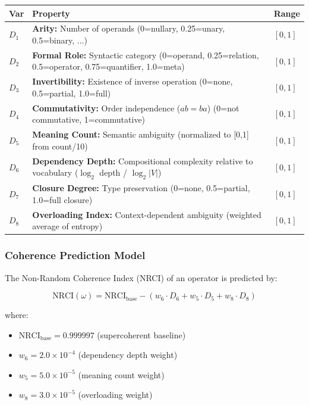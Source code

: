 \begin{table}[h]
\centering
\small
\begin{tabular}{lp{7cm}l}
\toprule
\textbf{Var} & \textbf{Property} & \textbf{Range} \\
\midrule
$D_1$ & \textbf{Arity:} Number of operands (0=nullary, 0.25=unary, 0.5=binary, ...) & $[0, 1]$ \\
$D_2$ & \textbf{Formal Role:} Syntactic category (0=operand, 0.25=relation, 0.5=operator, 0.75=quantifier, 1.0=meta) & $[0, 1]$ \\
$D_3$ & \textbf{Invertibility:} Existence of inverse operation (0=none, 0.5=partial, 1.0=full) & $[0, 1]$ \\
$D_4$ & \textbf{Commutativity:} Order independence ($ab = ba$) (0=not commutative, 1=commutative) & $[0, 1]$ \\
$D_5$ & \textbf{Meaning Count:} Semantic ambiguity (normalized to [0,1] from count/10) & $[0, 1]$ \\
$D_6$ & \textbf{Dependency Depth:} Compositional complexity relative to vocabulary ($\log_2$ depth / $\log_2|V|$) & $[0, 1]$ \\
$D_7$ & \textbf{Closure Degree:} Type preservation (0=none, 0.5=partial, 1.0=full closure) & $[0, 1]$ \\
$D_8$ & \textbf{Overloading Index:} Context-dependent ambiguity (weighted average of entropy) & $[0, 1]$ \\
\bottomrule
\end{tabular}
\end{table}

\subsubsection{Coherence Prediction Model}

The Non-Random Coherence Index (NRCI) of an operator is predicted by:

\begin{equation}
\boxed{\text{NRCI}(\omega) = \text{NRCI}_{\text{base}} - \left(w_6 \cdot D_6 + w_5 \cdot D_5 + w_8 \cdot D_8\right)}
\end{equation}

where:
\begin{itemize}
    \item $\text{NRCI}_{\text{base}} = 0.999997$ (supercoherent baseline)
    \item $w_6 = 2.0 \times 10^{-4}$ (dependency depth weight)
    \item $w_5 = 5.0 \times 10^{-5}$ (meaning count weight)
    \item $w_8 = 3.0 \times 10^{-5}$ (overloading weight)
\end{itemize}

